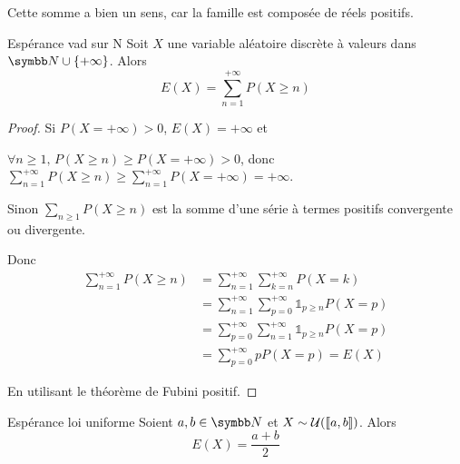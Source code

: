 \begin{remarque}
    Cette somme a bien un sens, car la famille est composée de réels positifs.
\end{remarque}

\begin{proposition}{Espérance vad sur N }{}
    Soit $X$ une variable aléatoire discrète à valeurs dans $\N \cup \{+\infty\}$. Alors
    $$ E(X) = \sum_{n = 1}^{+ \infty} P(X \geqslant n) $$
\end{proposition}

\begin{proof}
    Si $P(X = + \infty) >0$, $E(X) = + \infty$ et

    $\forall n \geqslant 1, \, P(X \geqslant n) \geqslant P(X = + \infty) > 0$, donc
    $\displaystyle \sum_{n = 1}^{+ \infty} P(X \geqslant n) \geqslant \sum_{n = 1}^{+ \infty} P(X = + \infty) = + \infty$.

    \avspace Sinon $\sum_{n \geqslant 1} P(X \geqslant n)$ est la somme d'une série à termes positifs
    convergente ou divergente.

    Donc 
    \begin{align}
        \sum_{n = 1}^{+ \infty} P(X \geqslant n) & = \sum_{n = 1}^{+ \infty} \sum_{k = n}^{+ \infty} P(X = k) \\
        & = \sum_{n = 1}^{+ \infty} \sum_{p = 0}^{+ \infty} \mathbb 1_{p \geqslant n} P(X = p) \\
        & = \sum_{p = 0}^{+ \infty} \sum_{n = 1}^{+ \infty} \mathbb 1_{p \geqslant n} P(X = p) \\
        & = \sum_{p = 0}^{+ \infty} p P(X = p) = E(X)
    \end{align}

    En utilisant le théorème de Fubini positif. 

\end{proof}

\begin{proposition}{Espérance loi uniforme}{}
    Soient $a, b \in \N$ et $X \sim \mathcal U([\![a, b]\!])$. Alors
    $$ E(X) = \frac{a + b}{2} $$
\end{proposition}

